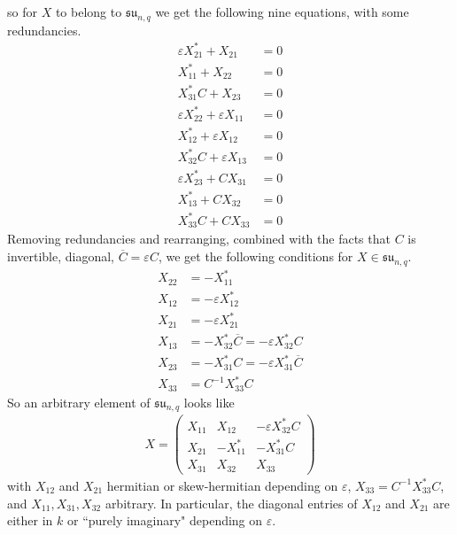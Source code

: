 \documentclass[12pt]{article}
\theoremstyle{definition}
\newcommand{\eps}{\varepsilon}
\newcommand{\inv}{^{-1}}
\newcommand{\ov}{\overline}
\newcommand{\fraksu}{\mathfrak{su}}
\begin{document}
so for $X$ to belong to $\fraksu_{n,q}$ we get the following nine equations, with some redundancies.
\begin{align*}
	\eps X_{21}^* + X_{21} &= 0 \\
	X_{11}^* + X_{22} &= 0 \\
	X_{31}^* C + X_{23} &= 0 \\
	\eps X_{22}^* + \eps X_{11} &= 0 \\
	X_{12}^* + \eps X_{12} &= 0 \\
	X_{32}^* C +\eps X_{13} &= 0 \\
	\eps X_{23}^* + CX_{31} &= 0 \\
	X_{13}^* + C X_{32} &= 0 \\
	X_{33}^* C + C X_{33} &= 0
\end{align*}
Removing redundancies and rearranging, combined with the facts that $C$ is invertible, diagonal, $\ov C = \eps C$, we get the following conditions for $X \in \fraksu_{n,q}$.
\begin{align*}
	X_{22} &= -X_{11}^* \\
	X_{12} &= - \eps X_{12}^* \\
	X_{21} &= - \eps X_{21}^* \\
	X_{13} &= - X_{32}^* \ov C = - \eps X_{32}^* C \\
	X_{23} &= - X_{31}^* C = - \eps X_{31}^* \ov C \\
	X_{33} &= C \inv X_{33}^* C
\end{align*}
So an arbitrary element of $\fraksu_{n,q}$ looks like
\begin{align*}
	X = \begin{pmatrix}
		X_{11} & X_{12} & - \eps X_{32}^* C \\
		X_{21} & - X_{11}^* & - X_{31}^* C \\
		X_{31} & X_{32} & X_{33}
		\end{pmatrix}
\end{align*}
with $X_{12}$ and $X_{21}$ hermitian or skew-hermitian depending on $\eps$, $X_{33} = C \inv X_{33}^* C$, and $X_{11}, X_{31}, X_{32}$ arbitrary. In particular, the diagonal entries of $X_{12}$ and $X_{21}$ are either in $k$ or ``purely imaginary" depending on $\eps$.
\end{document}
